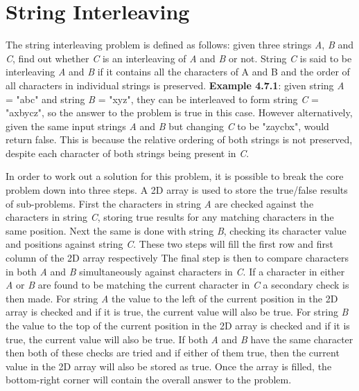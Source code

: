 \section{String Interleaving}
The string interleaving problem is defined as follows: given three strings \textit{A}, \textit{B} and \textit{C}, find out whether \textit{C} is an interleaving of \textit{A} and \textit{B} or not. String \textit{C} is said to be interleaving \textit{A} and \textit{B} if it contains all the characters of A and B and the order of all characters in individual strings is preserved\cite{interleave}.
\medbreak
\textbf{Example 4.7.1}: given string \textit{A} = "abc" and string \textit{B} = "xyz", they can be interleaved to form string \textit{C} = "axbycz", so the answer to the problem is true in this case. However alternatively, given the same input strings \textit{A} and \textit{B} but changing \textit{C} to be "zaycbx", would return false. This is because the relative ordering of both strings is not preserved, despite each character of both strings being present in \textit{C}.

\medbreak\noindent
In order to work out a solution for this problem, it is possible to break the core problem down into three steps. A 2D array is used to store the true/false results of sub-problems. First the characters in string \textit{A} are checked against the characters in string \textit{C}, storing true results for any matching characters in the same position. Next the same is done with string \textit{B}, checking its character value and positions against string \textit{C}. These two steps will fill the first row and first column of the 2D array respectively The final step is then to compare characters in both \textit{A} and \textit{B} simultaneously against characters in \textit{C}. If a character in either \textit{A} or \textit{B} are found to be matching the current character in \textit{C} a secondary check is then made. For string \textit{A} the value to the left of the current position in the 2D array is checked and if it is true, the current value will also be true. For string \textit{B} the value to the top of the current position in the 2D array is checked and if it is true, the current value will also be true. If both \textit{A} and \textit{B} have the same character  then both of these checks are tried and if either of them true, then the current value in the 2D array will also be stored as true. Once the array is filled, the bottom-right corner will contain the overall answer to the problem.

